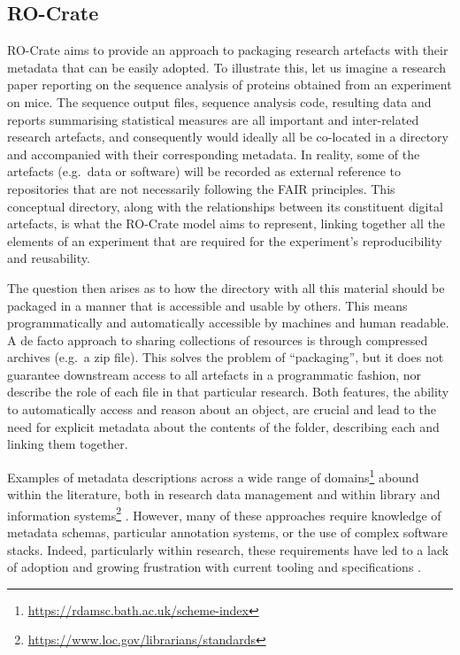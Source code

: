 \subsection{RO-Crate}\label{ch5:rocrate}

RO-Crate aims to provide an approach to packaging research artefacts
with their metadata that can be easily adopted. To illustrate this, let
us imagine a research paper reporting on the sequence analysis of
proteins obtained from an experiment on mice. The sequence output files,
sequence analysis code, resulting data and reports summarising
statistical measures are all important and inter-related research
artefacts, and consequently would ideally all be co-located in a
directory and accompanied with their corresponding metadata. In reality,
some of the artefacts (e.g.~data or software) will be recorded as
external reference to repositories that are not necessarily following
the FAIR principles. This conceptual directory, along with the
relationships between its constituent digital artefacts, is what the
RO-Crate model aims to represent, linking together all the elements of
an experiment that are required for the experiment's reproducibility and
reusability.

The question then arises as to how the directory with all this material
should be packaged in a manner that is accessible and usable by others.
This means programmatically and automatically accessible by machines and
human readable. A de facto approach to sharing collections of resources
is through compressed archives (e.g.~a zip file). This solves the
problem of ``packaging'', but it does not guarantee downstream access to
all artefacts in a programmatic fashion, nor describe the role of each
file in that particular research. Both features, the ability to
automatically access and reason about an object, are crucial and lead to
the need for explicit metadata about the contents of the folder,
describing each and linking them together.

Examples of metadata descriptions across a wide range of
domains\footnote{\url{https://rdamsc.bath.ac.uk/scheme-index}} abound within the
literature, both in research data management
\cite{Amorim 2016,Farnel 2014,eosc-interop-framework}
and within library and information
systems\footnote{\url{https://www.loc.gov/librarians/standards}} \cite{Mai Chan 1995,ch5-127}. However, many of these approaches require
knowledge of metadata schemas, particular annotation systems, or the
use of complex software stacks. Indeed, particularly within research,
these requirements have led to a lack of adoption and growing
frustration with current tooling and specifications
\cite{ch5-94,ch5-119,ch5-102}.

